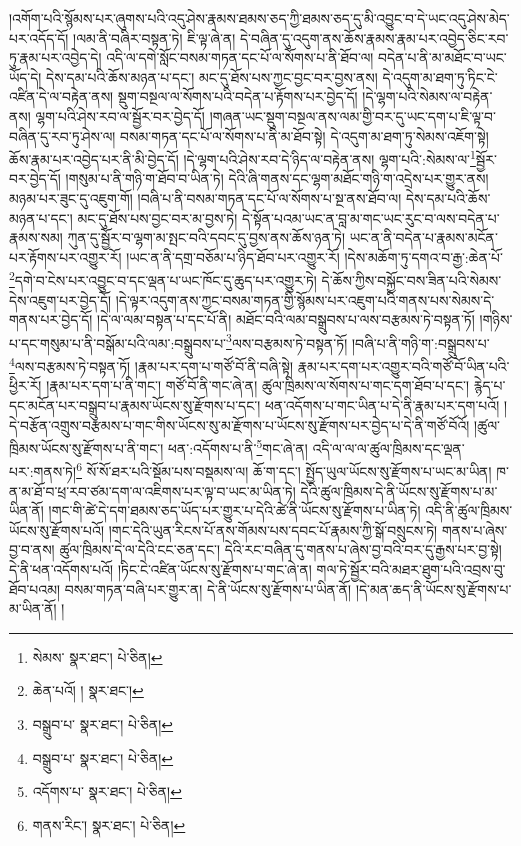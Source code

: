 །འགོག་པའི་སྙོམས་པར་ཞུགས་པའི་འདུ་ཤེས་རྣམས་ཐམས་ཅད་ཀྱི་ཐམས་ཅད་དུ་མི་འབྱུང་བ་དེ་ཡང་འདུ་ཤེས་མེད་པར་འདོད་དོ། །ལམ་ནི་བཞིར་བསྟན་ཏེ། ཇི་ལྟ་ཞེ་ན། དེ་བཞིན་དུ་འདུག་ནས་ཆོས་རྣམས་རྣམ་པར་འབྱེད་ཅིང་རབ་ཏུ་རྣམ་པར་འབྱེད་དེ། འདི་ལ་དགེ་སློང་བསམ་གཏན་དང་པོ་ལ་སོགས་པ་ནི་ཐོབ་ལ། བདེན་པ་ནི་མ་མཐོང་བ་ཡང་ཡོད་དེ། དེས་དམ་པའི་ཆོས་མཉན་པ་དང་། མང་དུ་ཐོས་པས་ཀྱང་བྱང་བར་བྱས་ནས། དེ་འདུག་མ་ཐག་ཏུ་ཏིང་ངེ་འཛིན་དེ་ལ་བརྟེན་ནས། སྡུག་བསྔལ་ལ་སོགས་པའི་བདེན་པ་རྟོགས་པར་བྱེད་དོ། །དེ་ལྷག་པའི་སེམས་ལ་བརྟེན་ནས། ལྷག་པའི་ཤེས་རབ་ལ་སྦྱོར་བར་བྱེད་དོ། །གཞན་ཡང་སྡུག་བསྔལ་ནས་ལམ་གྱི་བར་དུ་ཡང་དག་པ་ཇི་ལྟ་བ་བཞིན་དུ་རབ་ཏུ་ཤེས་ལ། བསམ་གཏན་དང་པོ་ལ་སོགས་པ་ནི་མ་ཐོབ་སྟེ། དེ་འདུག་མ་ཐག་ཏུ་སེམས་འཇོག་སྟེ། ཆོས་རྣམ་པར་འབྱེད་པར་ནི་མི་བྱེད་དོ། །དེ་ལྷག་པའི་ཤེས་རབ་དེ་ཉིད་ལ་བརྟེན་ནས། ལྷག་པའི་:སེམས་ལ་\footnote{སེམས་  སྣར་ཐང་།  པེ་ཅིན། }སྦྱོར་བར་བྱེད་དོ། །གསུམ་པ་ནི་གཉི་ག་ཐོབ་བ་ཡིན་ཏེ། དེའི་ཞི་གནས་དང་ལྷག་མཐོང་གཉི་ག་འདྲེས་པར་གྱུར་ནས། མཉམ་པར་ཟུང་དུ་འཇུག་གོ། །བཞི་པ་ནི་བསམ་གཏན་དང་པོ་ལ་སོགས་པ་སྔ་ནས་ཐོབ་ལ། དེས་དམ་པའི་ཆོས་མཉན་པ་དང་། མང་དུ་ཐོས་པས་བྱང་བར་མ་བྱས་ཏེ། དེ་སྟོན་པའམ་ཡང་ན་བླ་མ་གང་ཡང་རུང་བ་ལས་བདེན་པ་རྣམས་སམ། ཀུན་དུ་སྦྱོར་བ་ལྷག་མ་སྤང་བའི་དབང་དུ་བྱས་ནས་ཆོས་ཉན་ཏེ། ཡང་ན་ནི་བདེན་པ་རྣམས་མངོན་པར་རྟོགས་པར་འགྱུར་རོ། །ཡང་ན་ནི་དགྲ་བཅོམ་པ་ཉིད་ཐོབ་པར་འགྱུར་རོ། །དེས་མཆོག་ཏུ་དགའ་བ་རྒྱ་:ཆེན་པོ་\footnote{ཆེན་པའོ། །  སྣར་ཐང་། }དགེ་བ་ངེས་པར་འབྱུང་བ་དང་ལྡན་པ་ཡང་ཁོང་དུ་ཆུད་པར་འགྱུར་ཏེ། དེ་ཆོས་ཀྱིས་བསྐྱོང་བས་ཟིན་པའི་སེམས་དེས་འཇུག་པར་བྱེད་དོ། །དེ་ལྟར་འདུག་ནས་ཀྱང་བསམ་གཏན་གྱི་སྙོམས་པར་འཇུག་པའི་གནས་པས་སེམས་དེ་གནས་པར་བྱེད་དོ། །དེ་ལ་ལམ་བསྟན་པ་དང་པོ་ནི། མཐོང་བའི་ལམ་བསྒྲུབས་པ་ལས་བརྩམས་ཏེ་བསྟན་ཏོ། །གཉིས་པ་དང་གསུམ་པ་ནི་བསྒོམ་པའི་ལམ་:བསྒྲུབས་པ་\footnote{བསྒྲུབ་པ་  སྣར་ཐང་།  པེ་ཅིན། }ལས་བརྩམས་ཏེ་བསྟན་ཏོ། །བཞི་པ་ནི་གཉི་ག་:བསྒྲུབས་པ་\footnote{བསྒྲུབ་པ་  སྣར་ཐང་།  པེ་ཅིན། }ལས་བརྩམས་ཏེ་བསྟན་ཏོ། །རྣམ་པར་དག་པ་གཙོ་བོ་ནི་བཞི་སྟེ། རྣམ་པར་དག་པར་འགྱུར་བའི་གཙོ་བོ་ཡིན་པའི་ཕྱིར་རོ། །རྣམ་པར་དག་པ་ནི་གང་། གཙོ་བོ་ནི་གང་ཞེ་ན། ཚུལ་ཁྲིམས་ལ་སོགས་པ་གང་དག་ཐོབ་པ་དང་། རྙེད་པ་དང་མངོན་པར་བསྒྲུབ་པ་རྣམས་ཡོངས་སུ་རྫོགས་པ་དང་། ཕན་འདོགས་པ་གང་ཡིན་པ་དེ་ནི་རྣམ་པར་དག་པའོ། །དེ་བརྩོན་འགྲུས་བརྩམས་པ་གང་གིས་ཡོངས་སུ་མ་རྫོགས་པ་ཡོངས་སུ་རྫོགས་པར་བྱེད་པ་དེ་ནི་གཙོ་བོའོ། །ཚུལ་ཁྲིམས་ཡོངས་སུ་རྫོགས་པ་ནི་གང་། ཕན་:འདོགས་པ་ནི་\footnote{འདོགས་པ་  སྣར་ཐང་།  པེ་ཅིན། }གང་ཞེ་ན། འདི་ལ་ལ་ལ་ཚུལ་ཁྲིམས་དང་ལྡན་པར་:གནས་ཏེ།\footnote{གནས་རིང་།  སྣར་ཐང་།  པེ་ཅིན། } སོ་སོ་ཐར་པའི་སྡོམ་པས་བསྡམས་ལ། ཆོ་ག་དང་། སྤྱོད་ཡུལ་ཡོངས་སུ་རྫོགས་པ་ཡང་མ་ཡིན། ཁ་ན་མ་ཐོ་བ་ཕྲ་རབ་ཙམ་དག་ལ་འཇིགས་པར་ལྟ་བ་ཡང་མ་ཡིན་ཏེ། དེའི་ཚུལ་ཁྲིམས་དེ་ནི་ཡོངས་སུ་རྫོགས་པ་མ་ཡིན་ནོ། །གང་གི་ཚེ་དེ་དག་ཐམས་ཅད་ཡོད་པར་གྱུར་པ་དེའི་ཚེ་ནི་ཡོངས་སུ་རྫོགས་པ་ཡིན་ཏེ། འདི་ནི་ཚུལ་ཁྲིམས་ཡོངས་སུ་རྫོགས་པའོ། །གང་དེའི་ཡུན་རིངས་པོ་ནས་གོམས་པས་དབང་པོ་རྣམས་ཀྱི་སྒོ་བསྲུངས་ཏེ། གནས་པ་ཞེས་བྱ་བ་ནས། ཚུལ་ཁྲིམས་དེ་ལ་དེའི་ངང་ཅན་དང་། དེའི་རང་བཞིན་དུ་གནས་པ་ཞེས་བྱ་བའི་བར་དུ་རྒྱས་པར་བྱ་སྟེ། དེ་ནི་ཕན་འདོགས་པའོ། །ཏིང་ངེ་འཛིན་ཡོངས་སུ་རྫོགས་པ་གང་ཞེ་ན། གལ་ཏེ་སྦྱོར་བའི་མཐར་ཐུག་པའི་འབྲས་བུ་ཐོབ་པའམ། བསམ་གཏན་བཞི་པར་གྱུར་ན། དེ་ནི་ཡོངས་སུ་རྫོགས་པ་ཡིན་ནོ། །དེ་མན་ཆད་ནི་ཡོངས་སུ་རྫོགས་པ་མ་ཡིན་ནོ། །
